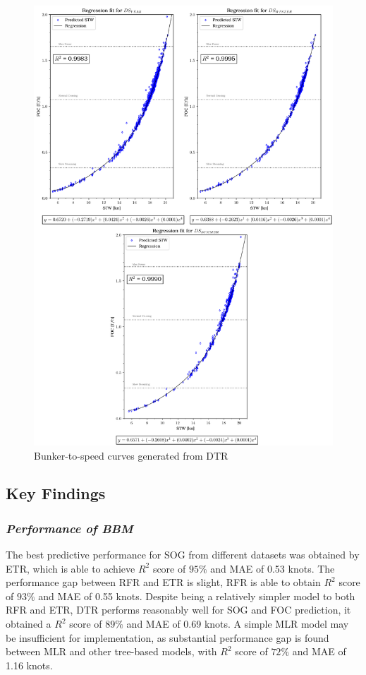 \begin{figure}[h!]
    \centering
    \includegraphics[width=.9\linewidth]{02_figures/poly_dtr_combi.png}
    \caption{Bunker-to-speed curves generated from DTR}
    \label{fig:FOC_plot_dtr_combi}
\end{figure}
\newpage

\subsection{Key Findings}\label{sec:key_findings}

\subsubsection*{\emph{Performance of BBM}}

The best predictive performance for SOG from different datasets was obtained by ETR, which is able to achieve $R^2$ score of $95\%$ and MAE of 0.53 knots. The performance gap between RFR and ETR is slight, RFR is able to obtain $R^2$ score of $93\%$ and MAE of 0.55 knots. Despite being a relatively simpler model to both RFR and ETR, DTR performs reasonably well for SOG and FOC prediction, it obtained a $R^2$ score of $89\%$ and MAE of 0.69 knots. A simple MLR model may be insufficient for implementation, as substantial performance gap is found between MLR and other tree-based models, with $R^2$ score of $72\%$ and MAE of 1.16 knots.\\


